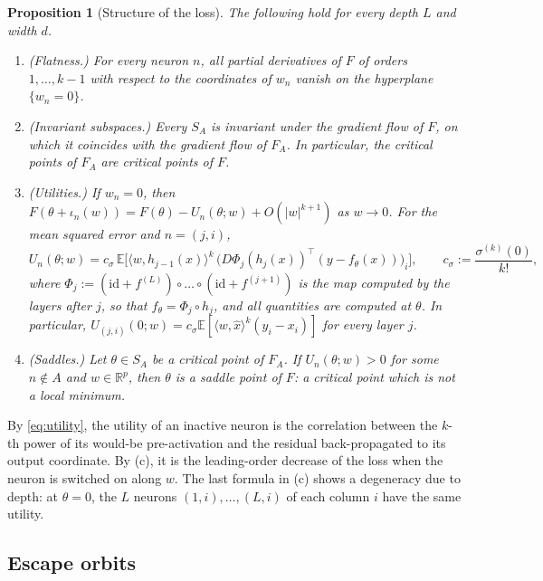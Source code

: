 \documentclass[11pt]{article}
\newtheorem{proposition}[theorem]{Proposition}
\theoremstyle{definition}
\theoremstyle{remark}
\numberwithin{equation}{section}
\newcommand{\R}{\mathbb{R}}
\newcommand{\E}{\mathbb{E}}
\newcommand{\ip}[2]{\langle #1,#2\rangle}
\newcommand{\id}{\mathrm{id}}
\begin{document}
\begin{proposition}[Structure of the loss]\label{prop:structure}
The following hold for every depth $L$ and width $d$.
\begin{enumerate}[label=\textup{(\alph*)}]
\item\emph{(Flatness.)} For every neuron $n$, all partial derivatives of $F$ of orders $1,\dots,k-1$ with respect to the coordinates of $w_n$ vanish on the hyperplane $\{w_n=0\}$.
\item\emph{(Invariant subspaces.)} Every $S_A$ is invariant under the gradient flow of $F$, on which it coincides with the gradient flow of $F_A$. In particular, the critical points of $F_A$ are critical points of $F$.
\item\emph{(Utilities.)} If $w_n=0$, then $F(\theta+\iota_n(w))=F(\theta)-U_n(\theta;w)+O(|w|^{k+1})$ as $w\to0$. For the mean squared error and $n=(j,i)$,
\begin{equation}\label{eq:utility}
U_n(\theta;w)=c_\sigma\,\E\Big[\ip{w}{\hat h_{j-1}(x)}^k\,\big(D\Phi_j(h_j(x))^{\top}(y-f_\theta(x))\big)_i\Big],\qquad c_\sigma:=\frac{\sigma^{(k)}(0)}{k!},
\end{equation}
where $\Phi_j:=(\id+f^{(L)})\circ\dots\circ(\id+f^{(j+1)})$ is the map computed by the layers after $j$, so that $f_\theta=\Phi_j\circ h_j$, and all quantities are computed at $\theta$. In particular, $U_{(j,i)}(0;w)=c_\sigma\E[\ip{w}{\hat x}^k(y_i-x_i)]$ for every layer $j$.
\item\emph{(Saddles.)} Let $\theta\in S_A$ be a critical point of $F_A$. If $U_n(\theta;w)>0$ for some $n\notin A$ and $w\in\R^p$, then $\theta$ is a saddle point of $F$: a critical point which is not a local minimum.
\end{enumerate}
\end{proposition}

By \eqref{eq:utility}, the utility of an inactive neuron is the correlation between the $k$-th power of its would-be pre-activation and the residual back-propagated to its output coordinate. By (c), it is the leading-order decrease of the loss when the neuron is switched on along $w$. The last formula in (c) shows a degeneracy due to depth: at $\theta=0$, the $L$ neurons $(1,i),\dots,(L,i)$ of each column $i$ have the same utility.

\subsection{Escape orbits}
\end{document}
